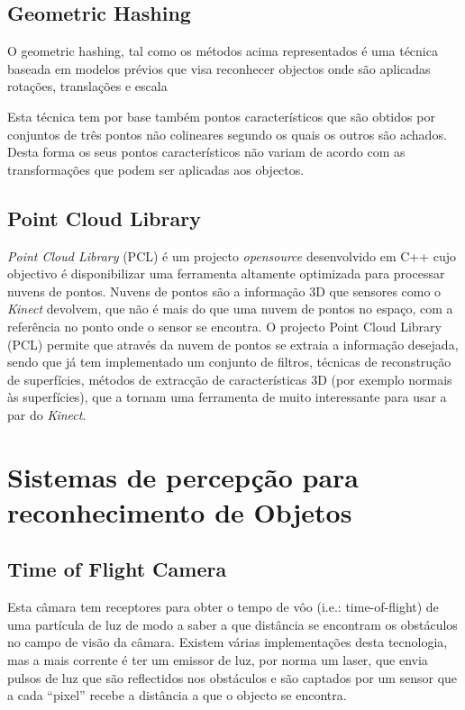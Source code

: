 \subsection{Geometric Hashing}

O geometric hashing, tal como os métodos acima representados é uma técnica baseada
em modelos prévios que visa reconhecer objectos onde são aplicadas rotações,
translações e escala \cite{1989SPIE.1095..515C}

Esta técnica tem por base também pontos característicos que são obtidos por
conjuntos de três pontos não colineares segundo os quais os outros são achados. 
Desta forma os seus pontos característicos não variam de acordo com as 
transformações que podem ser aplicadas aos objectos.


\subsection{Point Cloud Library}

\emph{Point Cloud Library} (PCL) é um projecto \emph{opensource} desenvolvido em C++ 
cujo objectivo é disponibilizar uma ferramenta altamente optimizada para 
processar nuvens de pontos. Nuvens de pontos são a informação 3D que sensores 
como o \emph{Kinect} devolvem, que não é mais do que uma nuvem de pontos no espaço,
com a referência no ponto onde o sensor se encontra.
O projecto Point Cloud Library (PCL) \cite{Rusu_ICRA2011_PCL} permite que
através da nuvem de pontos se extraia a informação desejada, sendo que
já tem implementado um conjunto de filtros, técnicas de reconstrução de
superfícies, métodos de extracção de características 3D (por exemplo
normais às superfícies), que a tornam uma ferramenta de muito interessante para usar
a par do \emph{Kinect}.

\section{Sistemas de percepção para reconhecimento de Objetos}

\subsection{Time of Flight Camera}
Esta câmara tem receptores para obter o tempo de vôo (i.e.: time-of-flight)
de uma partícula de luz de modo a saber a que distância se encontram os
obstáculos no campo de visão da câmara. Existem várias implementações desta
tecnologia, mas a mais corrente é ter um emissor de luz, por norma um laser,
que envia pulsos de luz que são reflectidos nos obstáculos e são captados por
um sensor que a cada “pixel” recebe a distância a que o objecto se encontra.

